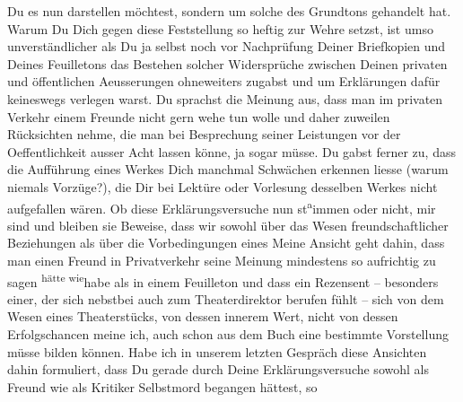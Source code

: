 \begin{ledgroupsized}[t]{13cm}
               Du es nun darstellen möchtest, sondern um solche des Grundtons gehandelt hat.\pend
           \pstart
           Warum Du Dich gegen diese Feststellung so heftig zur Wehre setzst, ist umso
               unverständlicher als Du ja selbst noch vor Nachprüfung Deiner Briefkopien und Deines
                  Feuilletons das Bestehen
               solcher Widersprüche zwischen Deinen privaten und öffentlichen Aeusserungen
               ohneweiters zugabst und um Erklärungen dafür keineswegs verlegen warst. Du sprachst
               die Meinung aus, dass man im privaten Verkehr einem Freunde nicht gern wehe tun wolle
               und daher zuweilen Rücksichten nehme, die man bei Besprechung seiner Leistungen vor
               der Oeffentlichkeit ausser Acht lassen könne, ja sogar müsse. Du gabst ferner zu,
               dass die Aufführung eines Werkes Dich manchmal Schwächen erkennen liesse (warum
               niemals Vorzüge?), die Dir bei Lektüre oder Vorlesung desselben Werkes nicht
               aufgefallen wären. Ob diese Erklärungsversuche nun st\substVorne{}\textsuperscript{a}\substDazwischen{}i\substHinten{}mmen oder nicht, mir sind und bleiben sie Beweise, dass wir sowohl über das
               Wesen freundschaftlicher Beziehungen als über die Vorbedingungen eines \label{T_L03521-4v}\label{T_L03521-4h}{ }{\pb}Meine Ansicht geht dahin, dass man
               einen Freund in Privatverkehr seine Meinung mindestens so aufrichtig zu sagen \substVorne{}\textsuperscript{hätte wie}{\allowbreak}\substDazwischen{}habe als\substHinten{} in einem Feuilleton und dass ein Rezensent – besonders einer, der sich
               nebstbei auch zum Theaterdirektor berufen fühlt – sich von dem Wesen eines
               Theaterstücks, von dessen innerem Wert, nicht von dessen Erfolgschancen meine ich,
               auch schon aus dem Buch eine bestimmte Vorstellung müsse bilden können. Habe ich in
               unserem letzten Gespräch diese Ansichten dahin formuliert, dass Du gerade durch Deine
               Erklärungsversuche sowohl als Freund wie als Kritiker Selbstmord begangen hättest, so

\end{ledgroupsized}

